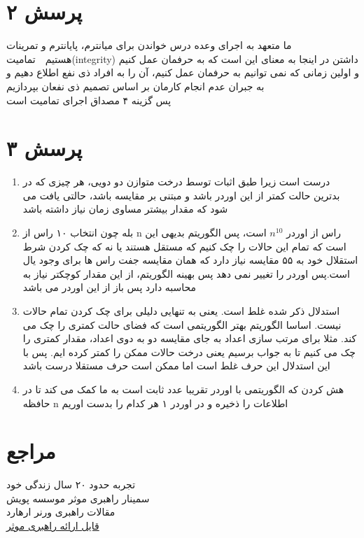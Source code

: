 \documentclass[a4paper]{article}
\begin{document}
\section*{پرسش ۲}
ما متعهد به اجرای وعده درس خواندن برای میانترم، پایانترم و تمرینات هستیم\
\
تمامیت(integrity) داشتن در اینجا به معنای این است که به حرفمان عمل کنیم و اولین زمانی که نمی توانیم به حرفمان عمل کنیم، آن را به افراد ذی نفع اطلاع دهیم و به جبران عدم انجام کارمان بر اساس تصمیم ذی نفعان بپردازیم\\
پس گزینه ۴ مصداق اجرای تمامیت است\\



\pagebreak

\section*{پرسش ۳}
\begin{enumerate}
\item{}
درست است زیرا طبق اثبات توسط درخت متوازن دو دویی، هر چیزی که در بدترین حالت کمتر از این اوردر باشد و مبتنی بر مقایسه باشد، حالتی یافت می شود که مقدار بیشتر مساوی
زمان نیاز داشته باشد
\item{}
بله چون انتخاب ۱۰ راس از n راس از اوردر
 $ n^10$
 است، پس الگوریتم بدیهی این است که تمام  این حالات را چک کنیم که مستقل هستند یا نه که چک کردن شرط استقلال خود به ۵۵ مقایسه نیاز دارد  که همان مقایسه جفت راس ها برای وجود یال است.پس اوردر را تغییر نمی دهد پس بهینه الگوریتم، از این مقدار کوچکتر نیاز به محاسبه دارد پس باز از این اوردر می باشد\\
 
\item{}
استدلال ذکر شده غلط است. یعنی به تنهایی دلیلی برای چک کردن تمام حالات نیست. اساسا الگوریتم بهتر الگوریتمی است که فضای حالت کمتری را چک می کند. مثلا برای مرتب سازی اعداد به جای مقایسه دو به دوی اعداد، مقدار کمتری را چک می کنیم تا به جواب برسیم یعنی درخت حالات ممکن را کمتر کرده ایم. پس با این استدلال این حرف غلط است اما ممکن است حرف مستقلا درست باشد\\

\item{}

هش کردن که الگوریتمی با اوردر تقریبا عدد ثابت است به ما کمک می کند تا در حافظه n اطلاعات را ذخیره و در اوردر ۱ هر کدام را بدست اوریم

\end{enumerate}

\pagebreak

\section*{مراجع}
تجربه حدود ۲۰ سال زندگی خود\\
سمینار راهبری موثر موسسه پویش\\
مقالات راهبری ورنر ارهارد\\
\href{https://papers.ssrn.com/sol3/papers.cfm?abstract_id=3081564}{قایل ارائه راهبری موثر}
\end{document}
